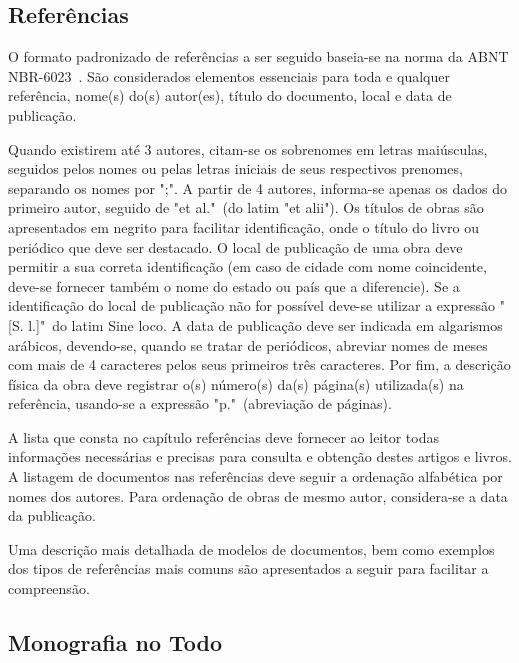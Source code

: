 \documentclass[repeatfields,xlists,xpacks,oneside,yearsonly]{ufrgscca}
\begin{document}
    \begin{appendix}



        \chapter{Referências}
        \label{sec:referencias}
        O formato padronizado de referências a ser seguido baseia-se na norma da ABNT
        NBR-6023~\cite{ABNT:NBR-6023-2002}. São considerados
        elementos essenciais para toda e qualquer referência, nome(s) do(s)
        autor(es), título do documento, local e data de publicação.

        Quando existirem até 3 autores, citam-se os sobrenomes em letras maiúsculas,
        seguidos pelos nomes ou pelas letras iniciais de seus respectivos prenomes,
        separando os nomes por ";". A partir de 4 autores, informa-se apenas os
        dados do primeiro autor, seguido de "et al."\ (do latim "et alii"). Os
        títulos de obras são apresentados em negrito para facilitar identificação,
        onde o título do livro ou periódico que deve ser destacado. O local de
        publicação de uma obra deve permitir a sua correta identificação (em caso de
        cidade com nome coincidente, deve-se fornecer também o nome do estado ou
        país que a diferencie). Se a identificação do local de publicação não for
        possível deve-se utilizar a expressão "[S. l.]"\ do latim Sine loco. A data
        de publicação deve ser indicada em algarismos arábicos, devendo-se, quando
        se tratar de periódicos, abreviar nomes de meses com mais de 4 caracteres
        pelos seus primeiros três caracteres. Por fim, a descrição física da obra
        deve registrar o(s) número(s) da(s) página(s) utilizada(s) na referência,
        usando-se a expressão "p."\ (abreviação de páginas).

        A lista que consta no capítulo referências deve fornecer ao leitor todas
        informações necessárias e precisas para consulta e obtenção destes artigos e
        livros. A listagem de documentos nas referências deve seguir a ordenação
        alfabética por nomes dos autores. Para ordenação de obras de mesmo autor,
        considera-se a data da publicação.

        Uma descrição mais detalhada de modelos de documentos, bem como exemplos dos
        tipos de referências mais comuns são apresentados a seguir para facilitar a
        compreensão.

        \section{Monografia no Todo}


\end{appendix}
\end{document}
